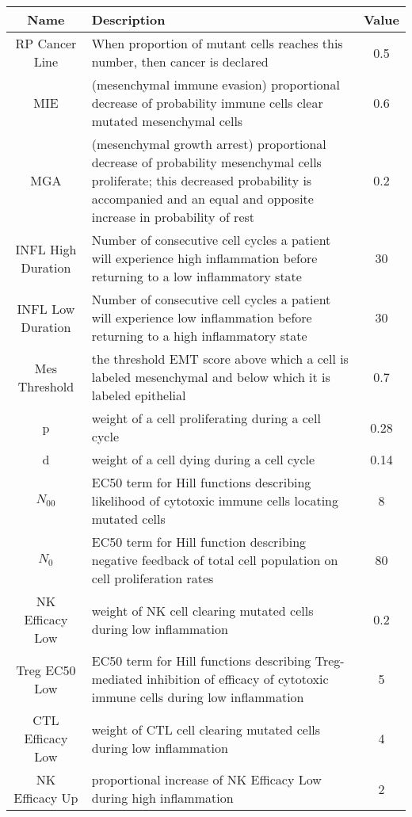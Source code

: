 \documentclass[11pt, a4paper, preprint]{article}
\begin{document}
\newpage

\begin{center}
 \begin{longtable}{||c | p{10cm} | c||} 
 \hline
 Name & Description & Value  \\ [0.5ex] 
 \hline\hline
 RP Cancer Line & When proportion of mutant cells reaches this number, then cancer is declared & 0.5  \\ 
 \hline
 MIE & (mesenchymal immune evasion) proportional decrease of probability immune cells clear mutated mesenchymal cells & 0.6  \\
 \hline
 MGA & (mesenchymal growth arrest) proportional decrease of probability mesenchymal cells proliferate; this decreased probability is accompanied and an equal and opposite increase in probability of rest & 0.2  \\
 \hline
 INFL High Duration & Number of consecutive cell cycles a patient will experience high inflammation before returning to a low inflammatory state & 30  \\
 \hline
INFL Low Duration & Number of consecutive cell cycles a patient will experience low inflammation before returning to a high inflammatory state & 30  \\
 \hline
Mes Threshold & the threshold EMT score above which a cell is labeled mesenchymal and below which it is labeled epithelial & 0.7 \\
 \hline
 p & weight of a cell proliferating during a cell cycle & 0.28 \\ 
 \hline
 d & weight of a cell dying during a cell cycle & 0.14 \\
 \hline
 $N_{00}$ & EC50 term for Hill functions describing likelihood of cytotoxic immune cells locating mutated cells & 8\\
 \hline
 $N_0$ & EC50 term for Hill function describing negative feedback of total cell population on cell proliferation rates & 80 \\
 \hline
  NK Efficacy Low & weight of NK cell clearing mutated cells during low inflammation & 0.2 \\
  \hline
  Treg EC50 Low & EC50 term for Hill functions describing Treg-mediated inhibition of efficacy of cytotoxic immune cells during low inflammation & 5 \\
  \hline
  CTL Efficacy Low & weight of CTL cell clearing mutated cells during low inflammation & 4 \\
  \hline
  NK Efficacy Up & proportional increase of NK Efficacy Low during high inflammation & 2 \\

\end{longtable}
\end{center}
\end{document}
